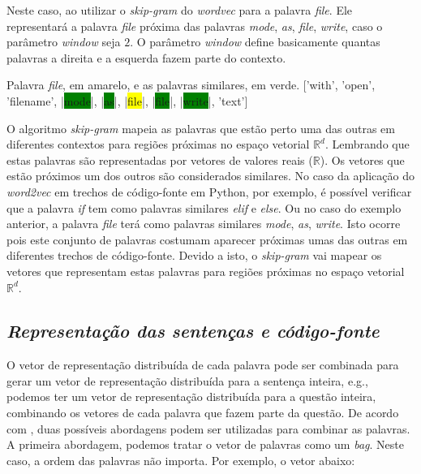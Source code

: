 Neste caso, ao utilizar o \textit{skip-gram} do \textit{wordvec} para a palavra \emph{file}. Ele representará a palavra \emph{file} próxima das palavras \emph{mode}, \emph{as}, \emph{file}, \emph{write}, caso o parâmetro \textit{window} seja $2$. O parâmetro \textit{window} define basicamente quantas palavras a direita e a esquerda fazem parte do contexto.

\begin{mypythonembedding}{Palavra \textit{file}, em amarelo, e as palavras similares, em verde.}
  ['with', 'open', 'filename', |\colorbox{green}{mode}|, |\colorbox{green}{as}|, |\colorbox{yellow}{file}|, |\colorbox{green}{file}|, |\colorbox{green}{write}|, 'text']
\end{mypythonembedding}

O algoritmo \textit{skip-gram} mapeia as palavras que estão perto uma das outras em diferentes contextos para regiões próximas no espaço vetorial $\mathbb{R}^{d}$. Lembrando que estas palavras são representadas por vetores de valores reais ($\mathbb{R}$). Os vetores que estão próximos um dos outros são considerados similares. No caso da aplicação do \textit{word2vec} em trechos de código-fonte em Python, por exemplo, é possível verificar que a palavra \emph{if} tem como palavras similares \emph{elif} e \emph{else}. Ou no caso do exemplo anterior, a palavra \emph{file} terá como palavras similares \emph{mode}, \emph{as}, \emph{write}. Isto ocorre pois este conjunto de palavras costumam aparecer próximas umas das outras em diferentes trechos de código-fonte. Devido a isto, o \textit{skip-gram} vai mapear os vetores que representam estas palavras para regiões próximas no espaço vetorial $\mathbb{R}^{d}$.


\subsection{\textit{Representação das sentenças e código-fonte}}

O vetor de representação distribuída de cada palavra pode ser combinada para gerar um vetor de representação distribuída para a sentença inteira, e.g., podemos ter um vetor de representação distribuída para a questão inteira, combinando os vetores de cada palavra que fazem parte da questão. De acordo com \cite{cambronero-deep-learning-code-search:2019}, duas possíveis abordagens podem ser utilizadas para combinar as palavras. A primeira abordagem, podemos tratar o vetor de palavras como um \textit{bag}. Neste caso, a ordem das palavras não importa. Por exemplo, o vetor abaixo:

